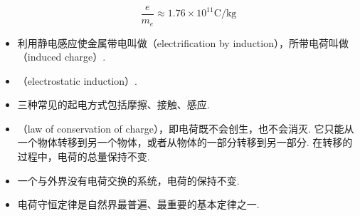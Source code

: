 \begin{itemize}
$$
\frac{e}{m_e}\approx1.76\times10^{11}\text{C}/\text{kg}
$$
\item 利用静电感应使金属带电叫做（electrification by induction），所带电荷叫做（induced charge）.
\item {}（electrostatic induction）.
\item 三种常见的起电方式包括摩擦、接触、感应.
\item {}（law of conservation of charge），即电荷既不会创生，也不会消灭. 它只能从一个物体转移到另一个物体，或者从物体的一部分转移到另一部分. 在转移的过程中，电荷的总量保持不变.
\item 一个与外界没有电荷交换的系统，电荷的保持不变.
\item 电荷守恒定律是自然界最普遍、最重要的基本定律之一.
\end{itemize}